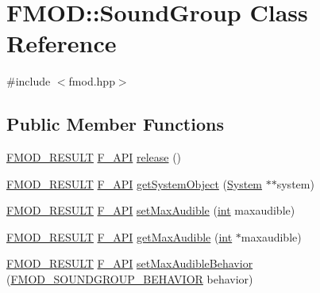 \hypertarget{class_f_m_o_d_1_1_sound_group}{\section{F\-M\-O\-D\-:\-:Sound\-Group Class Reference}
\label{class_f_m_o_d_1_1_sound_group}
}


{\ttfamily \#include $<$fmod.\-hpp$>$}

\subsection*{Public Member Functions}
\begin{DoxyCompactItemize}
\item 
\hyperlink{fmod_8h_ae6ddadf8cb315e93ae7e6456b19db276}{F\-M\-O\-D\-\_\-\-R\-E\-S\-U\-L\-T} \hyperlink{fmod_8h_ace803d13e798b0cdde4384f9f323b901}{F\-\_\-\-A\-P\-I} \hyperlink{class_f_m_o_d_1_1_sound_group_a184d5ee5cab2f885f21b2e23764e641d}{release} ()
\item 
\hyperlink{fmod_8h_ae6ddadf8cb315e93ae7e6456b19db276}{F\-M\-O\-D\-\_\-\-R\-E\-S\-U\-L\-T} \hyperlink{fmod_8h_ace803d13e798b0cdde4384f9f323b901}{F\-\_\-\-A\-P\-I} \hyperlink{class_f_m_o_d_1_1_sound_group_a2997b6d45663014b03d44bf791d54187}{get\-System\-Object} (\hyperlink{class_f_m_o_d_1_1_system}{System} $\ast$$\ast$system)
\item 
\hyperlink{fmod_8h_ae6ddadf8cb315e93ae7e6456b19db276}{F\-M\-O\-D\-\_\-\-R\-E\-S\-U\-L\-T} \hyperlink{fmod_8h_ace803d13e798b0cdde4384f9f323b901}{F\-\_\-\-A\-P\-I} \hyperlink{class_f_m_o_d_1_1_sound_group_a8e3b6569d346e94cf3f23d789eae5b5f}{set\-Max\-Audible} (\hyperlink{wglew_8h_a500a82aecba06f4550f6849b8099ca21}{int} maxaudible)
\item 
\hyperlink{fmod_8h_ae6ddadf8cb315e93ae7e6456b19db276}{F\-M\-O\-D\-\_\-\-R\-E\-S\-U\-L\-T} \hyperlink{fmod_8h_ace803d13e798b0cdde4384f9f323b901}{F\-\_\-\-A\-P\-I} \hyperlink{class_f_m_o_d_1_1_sound_group_ac63af09a716e9598b04394986e813bbb}{get\-Max\-Audible} (\hyperlink{wglew_8h_a500a82aecba06f4550f6849b8099ca21}{int} $\ast$maxaudible)
\item 
\hyperlink{fmod_8h_ae6ddadf8cb315e93ae7e6456b19db276}{F\-M\-O\-D\-\_\-\-R\-E\-S\-U\-L\-T} \hyperlink{fmod_8h_ace803d13e798b0cdde4384f9f323b901}{F\-\_\-\-A\-P\-I} \hyperlink{class_f_m_o_d_1_1_sound_group_a8f13ff7ef4a6e3768af07f3f1c64e3b3}{set\-Max\-Audible\-Behavior} (\hyperlink{fmod_8h_aaa0607e7d11dfadd764357cc56fe21eb}{F\-M\-O\-D\-\_\-\-S\-O\-U\-N\-D\-G\-R\-O\-U\-P\-\_\-\-B\-E\-H\-A\-V\-I\-O\-R} behavior)
$$
\end{DoxyCompactItemize}
